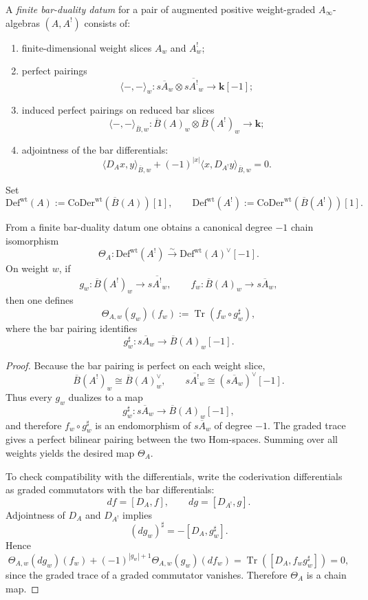 \begin{definition}
\label{def:finite-bar-duality-datum}
A \emph{finite bar-duality datum} for a pair of augmented positive weight-graded
$A_\infty$-algebras $(A,A^!)$ consists of:
\begin{enumerate}[label=\textup{(\roman*)}]
\item finite-dimensional weight slices $A_w$ and $A^!_w$;
\item perfect pairings
 \[
 \langle -, -\rangle_w\colon s\overline{A}_w\otimes s\overline{A^!}_w\to \mathbf{k}[-1];
 \]
\item induced perfect pairings on reduced bar slices
 \[
 \langle -, -\rangle_{\overline{B},w}\colon \overline{B}(A)_w\otimes \overline{B}(A^!)_w\to \mathbf{k};
 \]
\item adjointness of the bar differentials:
 \[
 \langle D_Ax,y\rangle_{\overline{B},w}
 +(-1)^{|x|}\langle x,D_{A^!}y\rangle_{\overline{B},w}=0.
 \]
\end{enumerate}
Set
\[
\mathrm{Def}^{\mathrm{wt}}(A):=\mathrm{CoDer}^{\mathrm{wt}}(\overline{B}(A))[1],
\qquad
\mathrm{Def}^{\mathrm{wt}}(A^!):=\mathrm{CoDer}^{\mathrm{wt}}(\overline{B}(A^!))[1].
\]
\end{definition}

\begin{theorem}
\label{thm:trace-theoretic-bar-duality}
From a finite bar-duality datum one obtains a canonical degree $-1$ chain
isomorphism
\[
\Theta_A\colon \mathrm{Def}^{\mathrm{wt}}(A^!)
\xrightarrow{\sim}
\mathrm{Def}^{\mathrm{wt}}(A)^\vee[-1].
\]
On weight $w$, if
\[
g_w\colon \overline{B}(A^!)_w\to s\overline{A^!}_w,
\qquad
f_w\colon \overline{B}(A)_w\to s\overline{A}_w,
\]
then one defines
\[
\Theta_{A,w}(g_w)(f_w):=\operatorname{Tr}(f_w\circ g_w^{\sharp}),
\]
where the bar pairing identifies
\[
g_w^{\sharp}\colon s\overline{A}_w\longrightarrow \overline{B}(A)_w[-1].
\]
\end{theorem}

\begin{proof}
Because the bar pairing is perfect on each weight slice,
\[
\overline{B}(A^!)_w\cong \overline{B}(A)_w^\vee,
\qquad
s\overline{A^!}_w\cong (s\overline{A}_w)^\vee[-1].
\]
Thus every $g_w$ dualizes to a map
\[
g_w^{\sharp}\colon s\overline{A}_w\to \overline{B}(A)_w[-1],
\]
and therefore $f_w\circ g_w^{\sharp}$ is an endomorphism of $s\overline{A}_w$ of
degree $-1$. The graded trace gives a perfect bilinear pairing between the two
Hom-spaces. Summing over all weights yields the desired map $\Theta_A$.

To check compatibility with the differentials, write the coderivation
differentials as graded commutators with the bar differentials:
\[
df=[D_A,f],
\qquad
dg=[D_{A^!},g].
\]
Adjointness of $D_A$ and $D_{A^!}$ implies
\[
(dg_w)^{\sharp}=-[D_A,g_w^{\sharp}].
\]
Hence
\[
\Theta_{A,w}(dg_w)(f_w)
+(-1)^{|g_w|+1}\Theta_{A,w}(g_w)(df_w)
=\operatorname{Tr}([D_A,f_wg_w^{\sharp}])=0,
\]
since the graded trace of a graded commutator vanishes. Therefore
$\Theta_A$ is a chain map.
\end{proof}

